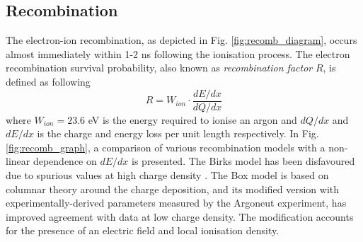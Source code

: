 \subsection{Recombination}
\label{sec:recomb}

The electron-ion recombination, as depicted in Fig. \ref{fig:recomb_diagram}, occurs almost immediately within 1-2 ns following the ionisation process.
The electron recombination survival probability, also known as \textit{recombination factor} $R$, is defined as following 
\begin{equation}
	R=W_{ion} \cdot \frac{dE/dx}{dQ/dx}
	\label{eq:recomb}
\end{equation}
where $W_{ion} = 23.6$ eV is the energy required to ionise an argon \cite{ion_e} and $dQ/dx$ and $dE/dx$ is the charge and energy loss per unit length respectively. 
In Fig. \ref{fig:recomb_graph}, a comparison of various recombination models with a non-linear dependence on $dE/dx$ is presented.
The Birks model has been disfavoured due to spurious values at high charge density \cite{argoneut_recomb}.
The Box model is based on columnar theory around the charge deposition, and its modified version with experimentally-derived parameters measured by the Argoneut experiment, has improved agreement with data at low charge density.
The modification accounts for the presence of an electric field and local ionisation density.
